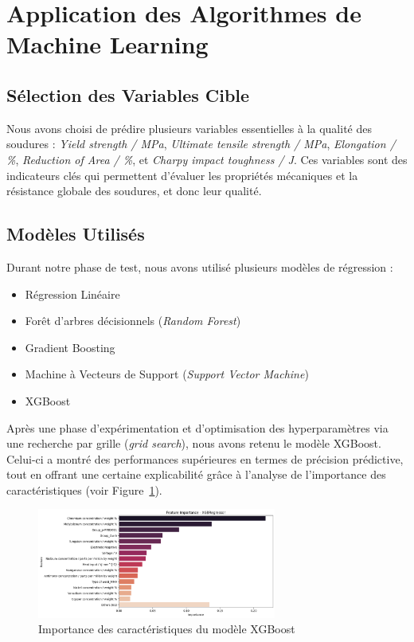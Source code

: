 \documentclass{article}
\begin{document}
\section{Application des Algorithmes de Machine Learning}

\subsection{Sélection des Variables Cible}

Nous avons choisi de prédire plusieurs variables essentielles à la qualité des soudures : \textit{Yield strength / MPa}, \textit{Ultimate tensile strength / MPa}, \textit{Elongation / \%}, \textit{Reduction of Area / \%}, et \textit{Charpy impact toughness / J}. Ces variables sont des indicateurs clés qui permettent d’évaluer les propriétés mécaniques et la résistance globale des soudures, et donc leur qualité.

\subsection{Modèles Utilisés}

Durant notre phase de test, nous avons utilisé plusieurs modèles de régression :

\begin{itemize}
\item Régression Linéaire
\item Forêt d’arbres décisionnels (\textit{Random Forest})
\item Gradient Boosting
\item Machine à Vecteurs de Support (\textit{Support Vector Machine})
\item XGBoost
\end{itemize}

Après une phase d’expérimentation et d’optimisation des hyperparamètres via une recherche par grille (\textit{grid search}), nous avons retenu le modèle XGBoost. Celui-ci a montré des performances supérieures en termes de précision prédictive, tout en offrant une certaine explicabilité grâce à l’analyse de l’importance des caractéristiques (voir Figure~\ref{fig:xgboost_feature_importance}).

\begin{figure}[H]
    \centering
    \includegraphics[width=0.7\textwidth]{images/xgboost_feature_importance.png}
    \caption{Importance des caractéristiques du modèle XGBoost}
    \label{fig:xgboost_feature_importance}
\end{figure}
\end{document}
